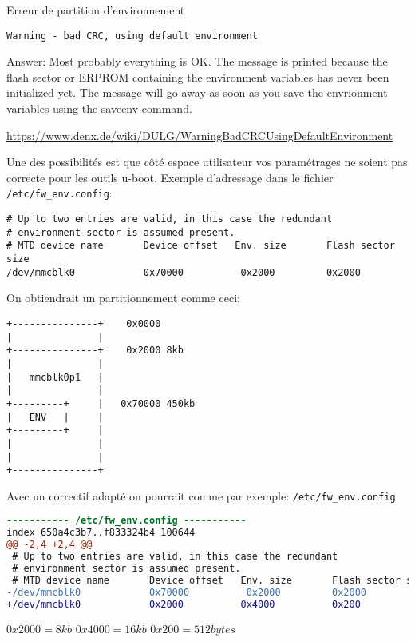 \documentclass[compress]{beamer}
\begin{document}
\begin{frame}[fragile]{Erreur de partition d'environnement}
\begin{lstlisting}[style=shell]
Warning - bad CRC, using default environment
\end{lstlisting}

Answer:
    Most probably everything is OK. The message is printed because the flash sector or ERPROM containing the environment variables has never been initialized yet. The message will go away as soon as you save the envrionment variables using the saveenv command. 
    
    \url{https://www.denx.de/wiki/DULG/WarningBadCRCUsingDefaultEnvironment}
\end{frame}

\begin{frame}[fragile]
Une des possibilités est que côté espace utilisateur vos paramétrages ne soient pas correcte pour les outils u-boot.\newline
Exemple d'adressage dans le fichier \texttt{/etc/fw\_env.config}:
\begin{lstlisting}[style=shell,basicstyle=\tiny\ttfamily\color{white}]
# Up to two entries are valid, in this case the redundant
# environment sector is assumed present.
# MTD device name       Device offset   Env. size       Flash sector size
/dev/mmcblk0            0x70000          0x2000         0x2000
\end{lstlisting}
\end{frame}

\begin{frame}[fragile]
On obtiendrait un partitionnement comme ceci:
\begin{lstlisting}[style=shell]
+---------------+    0x0000
|               |
+---------------+    0x2000 8kb
|               |
|   mmcblk0p1   |
|               |
+---------+     |   0x70000 450kb
|   ENV   |     |
+---------+     |
|               |
|               |
+---------------+
\end{lstlisting}
\end{frame}

\begin{frame}[fragile]
Avec un correctif adapté on pourrait comme par exemple:
\texttt{/etc/fw\_env.config}
\begin{lstlisting}[language=diff,basicstyle=\tiny\ttfamily\color{white}]
----------- /etc/fw_env.config -----------
index 650a4c3b7..f833324b4 100644
@@ -2,4 +2,4 @@
 # Up to two entries are valid, in this case the redundant
 # environment sector is assumed present.
 # MTD device name       Device offset   Env. size       Flash sector size
-/dev/mmcblk0            0x70000          0x2000         0x2000
+/dev/mmcblk0            0x2000          0x4000          0x200
\end{lstlisting}
$0x2000 = 8kb$\newline
$0x4000 = 16kb$\newline
$0x200  = 512 bytes$
\end{frame}
\end{document}

